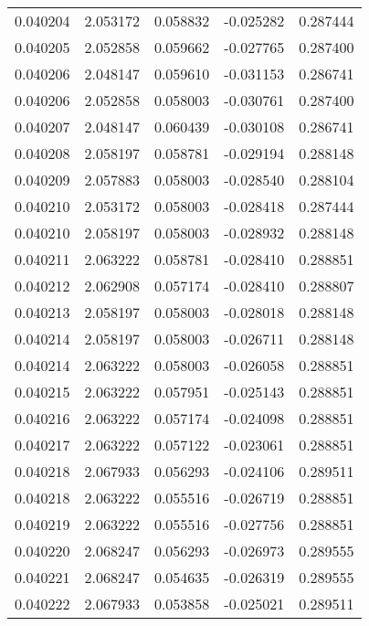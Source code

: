 \begin{tabular}{lrrrr}
0.040204    &  2.053172 &  0.058832 & -0.025282 &             0.287444 \\
0.040205    &  2.052858 &  0.059662 & -0.027765 &             0.287400 \\
0.040206    &  2.048147 &  0.059610 & -0.031153 &             0.286741 \\
0.040206    &  2.052858 &  0.058003 & -0.030761 &             0.287400 \\
0.040207    &  2.048147 &  0.060439 & -0.030108 &             0.286741 \\
0.040208    &  2.058197 &  0.058781 & -0.029194 &             0.288148 \\
0.040209    &  2.057883 &  0.058003 & -0.028540 &             0.288104 \\
0.040210    &  2.053172 &  0.058003 & -0.028418 &             0.287444 \\
0.040210    &  2.058197 &  0.058003 & -0.028932 &             0.288148 \\
0.040211    &  2.063222 &  0.058781 & -0.028410 &             0.288851 \\
0.040212    &  2.062908 &  0.057174 & -0.028410 &             0.288807 \\
0.040213    &  2.058197 &  0.058003 & -0.028018 &             0.288148 \\
0.040214    &  2.058197 &  0.058003 & -0.026711 &             0.288148 \\
0.040214    &  2.063222 &  0.058003 & -0.026058 &             0.288851 \\
0.040215    &  2.063222 &  0.057951 & -0.025143 &             0.288851 \\
0.040216    &  2.063222 &  0.057174 & -0.024098 &             0.288851 \\
0.040217    &  2.063222 &  0.057122 & -0.023061 &             0.288851 \\
0.040218    &  2.067933 &  0.056293 & -0.024106 &             0.289511 \\
0.040218    &  2.063222 &  0.055516 & -0.026719 &             0.288851 \\
0.040219    &  2.063222 &  0.055516 & -0.027756 &             0.288851 \\
0.040220    &  2.068247 &  0.056293 & -0.026973 &             0.289555 \\
0.040221    &  2.068247 &  0.054635 & -0.026319 &             0.289555 \\
0.040222    &  2.067933 &  0.053858 & -0.025021 &             0.289511 \\

\end{tabular}
